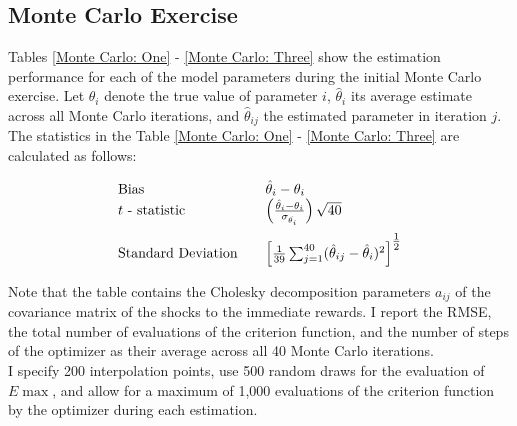 \subsection{Monte Carlo Exercise}
Tables \ref{Monte Carlo: One} - \ref{Monte Carlo: Three} show the estimation performance for each of the model parameters during the initial Monte Carlo exercise. Let $\theta_i$ denote the true value of parameter $i$, $\hat{\theta}_i$ its average estimate across all Monte Carlo iterations, and $\hat{\theta}_{ij}$ the estimated parameter in iteration $j$. The statistics in the Table \ref{Monte Carlo: One} - \ref{Monte Carlo: Three} are calculated as follows:

\renewcommand\arraystretch{2}
\begin{align*}\begin{array}{l@{\qquad}l}
\text{Bias} & \hat{\theta}_i - \theta_i\\\medskip
\text{$t$ - statistic} & \left(\frac{\hat{\theta}_i - \theta_i}{\sigma_{\hat{\theta_i}}}\right) \sqrt{40} \\
\text{Standard Deviation} & \left[ \frac{1}{39} \sum^{40}_{j = 1} (\hat{\theta}_{ij} - \hat{\theta}_i)^2
\right]^{\tfrac{1}{2}}
\end{array}
\end{align*}
\renewcommand\arraystretch{1}

Note that the table contains the Cholesky decomposition parameters $a_{ij}$ of the covariance matrix of the shocks to the immediate rewards. I report the RMSE, the total number of evaluations of the criterion function, and the number of steps of the optimizer as their average across all 40 Monte Carlo iterations.\\\newline
%
I specify 200 interpolation points, use 500 random draws for the evaluation of $E\max$, and allow for a maximum of 1,000 evaluations of the criterion function by the optimizer during each estimation.\clearpage



\clearpage
